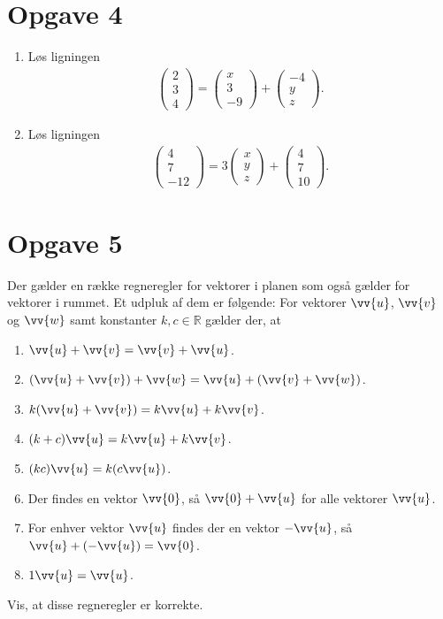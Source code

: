 \section*{Opgave 4}
\begin{enumerate}[label=\roman*)]
	\item Løs ligningen
	\begin{align*}
		\begin{pmatrix}
			2 \\ 3 \\ 4
		\end{pmatrix} =
		\begin{pmatrix}
			x \\ 3 \\ -9 
		\end{pmatrix}+
		\begin{pmatrix}
			-4 \\ y \\ z
		\end{pmatrix}.
	\end{align*}
	\item Løs ligningen
	\begin{align*}
		\begin{pmatrix}
			4 \\ 7 \\ -12
		\end{pmatrix} =
		3		
		\begin{pmatrix}
			x \\ y \\ z 
		\end{pmatrix} + 
		\begin{pmatrix}
			4 \\ 7 \\ 10
		\end{pmatrix}.
	\end{align*}
\end{enumerate}

\section*{Opgave 5}
Der gælder en række regneregler for vektorer i planen som også gælder for vektorer i rummet. Et udpluk af dem er følgende: For vektorer $\vv{u}$, $\vv{v}$ og $\vv{w}$ samt konstanter $k,c\in \mathbb{R}$ gælder der, at 
\begin{enumerate}[label=\roman*)]
	\item $\vv{u}+\vv{v} = \vv{v}+\vv{u}$.
	\item $(\vv{u}+\vv{v})+\vv{w} = \vv{u} + (\vv{v}+\vv{w})$.
	\item $k(\vv{u}+\vv{v}) = k\vv{u}+k\vv{v}$.
	\item $(k+c)\vv{u} = k\vv{u}+k\vv{v}$.
	\item $(kc)\vv{u} = k(c\vv{u})$.
	\item Der findes en vektor $\vv{0}$, så $\vv{0}+\vv{u}$ for alle vektorer $\vv{u}$. 
	\item For enhver vektor $\vv{u}$ findes der en vektor $-\vv{u}$, så $\vv{u}+(-\vv{u}) = \vv{0}$.
	\item $1\vv{u} = \vv{u}$.
\end{enumerate}
Vis, at disse regneregler er korrekte.